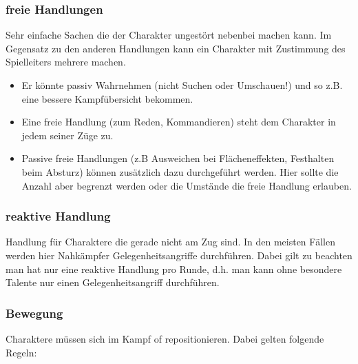 \documentclass{article}
\begin{document}
\subsubsection{freie Handlungen}

Sehr einfache Sachen die der Charakter ungestört nebenbei machen kann. Im Gegensatz zu den anderen Handlungen kann
ein Charakter mit Zustimmung des Spielleiters mehrere machen.

\begin{itemize}
\item Er könnte passiv Wahrnehmen (nicht Suchen oder Umschauen!) und so z.B. eine bessere Kampfübersicht bekommen.
\item Eine freie Handlung (zum Reden, Kommandieren) steht dem Charakter in jedem seiner Züge zu.
\item Passive freie Handlungen (z.B Ausweichen bei Flächeneffekten, Festhalten beim Absturz) können zusätzlich dazu durchgeführt werden. Hier sollte die Anzahl aber begrenzt werden oder die Umstände die freie Handlung erlauben.
\end{itemize}

\subsubsection{reaktive Handlung}

Handlung für Charaktere die gerade nicht am Zug sind. In den meisten Fällen werden hier Nahkämpfer
Gelegenheitsangriffe durchführen. Dabei gilt zu beachten man hat nur eine reaktive Handlung pro Runde, d.h. man kann
ohne besondere Talente nur einen Gelegenheitsangriff durchführen.

\subsubsection{Bewegung}

Charaktere müssen sich im Kampf of repositionieren. Dabei gelten folgende Regeln:
\end{document}
